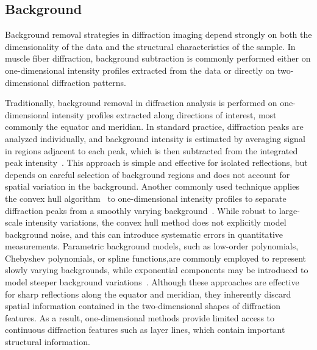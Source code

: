 \documentclass[iucr]{iucrjournals}
\begin{document}
\subsection{Background}

Background removal strategies in diffraction imaging depend strongly on both the dimensionality of the data and the structural characteristics of the sample. In muscle fiber diffraction, background subtraction is commonly performed either on one-dimensional intensity profiles extracted from the data or directly on two-dimensional diffraction patterns.

Traditionally, background removal in diffraction analysis is performed on one-dimensional intensity profiles extracted along directions of interest, most commonly the equator and meridian. In standard practice, diffraction peaks are analyzed individually, and background intensity is estimated by averaging signal in regions adjacent to each peak, which is then subtracted from the integrated peak intensity~\cite{NederKorsunskiy2018}. This approach is simple and effective for isolated reflections, but depends on careful selection of background regions and does not account for spatial variation in the background. Another commonly used technique applies the convex hull algorithm~\cite{jarvis1973convex_hull} to one-dimensional intensity profiles to separate diffraction peaks from a smoothly varying background~\cite{lee2019musclex}. While robust to large-scale intensity variations, the convex hull method does not explicitly model background noise, and this can introduce systematic errors in quantitative measurements. Parametric background models, such as low-order polynomials, Chebyshev polynomials, or spline functions,are commonly employed to represent slowly varying backgrounds, while exponential components may be introduced to model steeper background variations~\cite{rajkumar2007fibrefix}. Although these approaches are effective for sharp reflections along the equator and meridian, they inherently discard spatial information contained in the two-dimensional shapes of diffraction features. As a result, one-dimensional methods provide limited access to continuous diffraction features such as layer lines, which contain important structural information.
\end{document}
